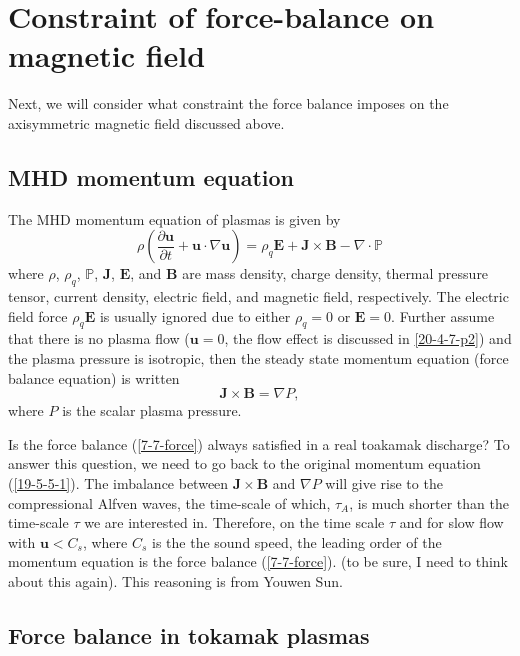 \documentclass{llncs}
\begin{document}
\section{Constraint of force-balance on magnetic field}

Next, we will consider what constraint the force balance imposes on the
axisymmetric magnetic field discussed above.

\subsection{MHD momentum equation}

The MHD momentum equation of plasmas is given by
\begin{equation}
  \label{19-5-5-1} \rho \left( \frac{\partial \mathbf{u}}{\partial t}
  +\mathbf{u} \cdot \nabla \mathbf{u} \right) = \rho_q \mathbf{E}+\mathbf{J}
  \times \mathbf{B}- \nabla \cdot \mathbb{P}
\end{equation}
where $\rho$, $\rho_q$, $\mathbb{P}$, $\mathbf{J}$, $\mathbf{E}$, and
$\mathbf{B}$ are mass density, charge density, thermal pressure tensor,
current density, electric field, and magnetic field, respectively. The
electric field force $\rho_q \mathbf{E}$ is usually ignored due to either
$\rho_q = 0$ or $\mathbf{E}= 0$. Further assume that there is no plasma flow
($\mathbf{u}= 0$, the flow effect is discussed in \ref{20-4-7-p2}) and the
plasma pressure is isotropic, then the steady state momentum equation (force
balance equation) is written
\begin{equation}
  \label{7-7-force} \mathbf{J} \times \mathbf{B}= \nabla P,
\end{equation}
where $P$ is the scalar plasma pressure.

Is the force balance (\ref{7-7-force}) always satisfied in a real toakamak
discharge? To answer this question, we need to go back to the original
momentum equation (\ref{19-5-5-1}). The imbalance between $\mathbf{J} \times
\mathbf{B}$ and $\nabla P$ will give rise to the compressional Alfven waves,
the time-scale of which, $\tau_A$, is much shorter than the time-scale $\tau$
we are interested in. Therefore, on the time scale $\tau$ and for slow flow
with $\mathbf{u}< C_s$, where $C_s$ is the the sound speed, the leading order
of the momentum equation is the force balance (\ref{7-7-force}). (to be sure,
I need to think about this again). This reasoning is from Youwen
Sun{\cite{ysun2012}}.

\subsection{Force balance in tokamak plasmas}\label{3-14-p1}
\end{document}
